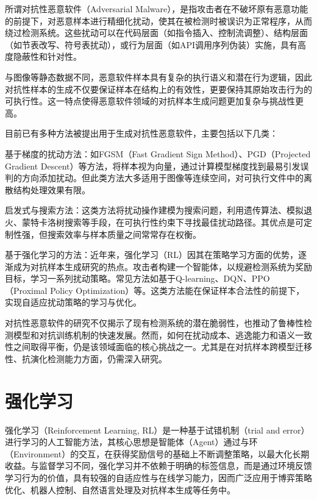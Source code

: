 所谓对抗性恶意软件（Adversarial Malware），是指攻击者在不破坏原有恶意功能的前提下，对恶意样本进行精细化扰动，使其在被检测时被误识为正常程序，从而绕过检测系统。这些扰动可以在代码层面（如指令插入、控制流调整）、结构层面（如节表改写、符号表扰动），或行为层面（如API调用序列伪装）实施，具有高度隐蔽性和针对性。


与图像等静态数据不同，恶意软件样本具有复杂的执行语义和潜在行为逻辑，因此对抗性样本的生成不仅要保证样本在结构上的有效性，更要保持其原始攻击行为的可执行性。这一特点使得恶意软件领域的对抗样本生成问题更加复杂与挑战性更高。


目前已有多种方法被提出用于生成对抗性恶意软件，主要包括以下几类：


基于梯度的扰动方法：如FGSM\cite{lupart2023study}（Fast Gradient Sign Method）、PGD\cite{bryniarski2021evading}（Projected Gradient Descent）等方法，将样本视为向量，通过计算模型梯度找到最易引发误判的方向添加扰动。但此类方法大多适用于图像等连续空间，对可执行文件中的离散结构处理效果有限。


启发式与搜索方法：这类方法将扰动操作建模为搜索问题，利用遗传算法\cite{wang2022black}、模拟退火\cite{bertsimas1993simulated}、蒙特卡洛树搜索\cite{chaslot2010monte}等手段，在可执行性约束下寻找最佳扰动路径。其优点是可定制性强，但搜索效率与样本质量之间常常存在权衡。

基于强化学习的方法：近年来，强化学习（RL）因其在策略学习方面的优势，逐渐成为对抗样本生成研究的热点。攻击者构建一个智能体，以规避检测系统为奖励目标，学习一系列扰动策略。常见方法如基于Q-learning\cite{watkins1992q}、DQN\cite{osband2016deep}、PPO\cite{yu2022surprising}（Proximal Policy Optimization）等。这类方法能在保证样本合法性的前提下，实现自适应扰动策略的学习与优化。

对抗性恶意软件的研究不仅揭示了现有检测系统的潜在脆弱性，也推动了鲁棒性检测模型和对抗训练机制的快速发展。然而，如何在扰动成本、逃逸能力和语义一致性之间取得平衡，仍是该领域面临的核心挑战之一。尤其是在对抗样本跨模型迁移性、抗演化检测能力方面，仍需深入研究。

\section{强化学习}

强化学习（Reinforcement Learning, RL）是一种基于试错机制（trial and error）进行学习的人工智能方法，其核心思想是智能体（Agent）通过与环（Environment）的交互，在获得奖励信号的基础上不断调整策略，以最大化长期收益。与监督学习不同，强化学习并不依赖于明确的标签信息，而是通过环境反馈学习行为的价值，具有较强的自适应性与在线学习能力，因而广泛应用于博弈策略优化、机器人控制、自然语言处理及对抗样本生成等任务中。

